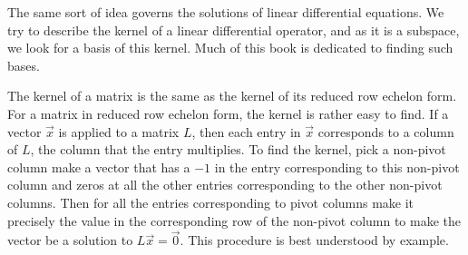 \documentclass{ximera}
\begin{document}
The same sort of idea governs the solutions of linear differential equations.  We try to describe the kernel of a linear differential operator, and as it is a subspace, we look for a basis of this kernel.  Much of this book is dedicated to finding such bases.

The kernel of a matrix is the same as the kernel of its reduced row echelon form.  For a matrix in reduced row echelon form, the kernel is rather easy to find.  If a vector $\vec{x}$ is applied to a matrix $L$, then each entry in $\vec{x}$ corresponds to a column of $L$, the column that the entry multiplies. To find the kernel, pick a non-pivot column make a vector that has a $-1$ in the entry corresponding to this non-pivot column and zeros at all the other entries corresponding to the other non-pivot columns. Then for all the entries corresponding to pivot columns make it precisely the value in the corresponding row of the non-pivot column to make the vector be a solution to $L \vec{x} = \vec{0}$. This procedure is best understood by example.
\end{document}

